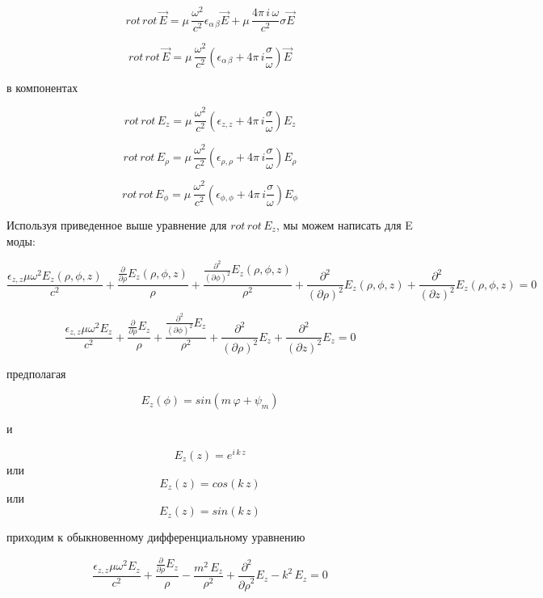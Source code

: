 \documentclass{article}
\begin{document}
$$rot\,rot\,\vec{E} = \mu\,\frac{\omega^2}{c^2} {\epsilon}_{\alpha\,\beta} \vec{E} + \mu\,\frac{4\pi\,i\,\omega}{c^2} \sigma \vec{E}$$

$$rot\,rot\,\vec{E} = \mu\,\frac{\omega^2}{c^2} \left({\epsilon}_{\alpha\,\beta} + 4\pi\,i\frac{\sigma}{\omega}\right) \vec{E}$$

в компонентах

$$rot\,rot\,{E}_{z} = \mu\,\frac{\omega^2}{c^2} \left({\epsilon}_{z,z} + 4\pi\,i\frac{\sigma}{\omega}\right) {E}_{z}$$

$$rot\,rot\,{E}_{\rho} = \mu\,\frac{\omega^2}{c^2} \left({\epsilon}_{\rho,\rho} + 4\pi\,i\frac{\sigma}{\omega}\right) {E}_{\rho}$$

$$rot\,rot\,{E}_{\phi} = \mu\,\frac{\omega^2}{c^2} \left({\epsilon}_{\phi,\phi} + 4\pi\,i\frac{\sigma}{\omega}\right) {E}_{\phi}$$

Используя приведенное выше уравнение для  $rot\,rot\,{E}_{z}$, мы можем написать для E моды:

$$\frac{{\epsilon}_{z,z} \mu \omega^{2} E_{z}\left({\rho}, {\phi}, \mathit{z}\right)}{c^{2}} + \frac{\frac{\partial}{\partial {\rho}}E_{z}\left({\rho}, {\phi}, \mathit{z}\right)}{{\rho}} + \frac{\frac{\partial^{2}}{(\partial {\phi})^{2}}E_{z}\left({\rho}, {\phi}, \mathit{z}\right)}{{\rho}^{2}} + \frac{\partial^{2}}{(\partial {\rho})^{2}}E_{z}\left({\rho}, {\phi}, \mathit{z}\right) + \frac{\partial^{2}}{(\partial \mathit{z})^{2}}E_{z}\left({\rho}, {\phi}, \mathit{z}\right) = 0$$


$$\frac{{\epsilon}_{z,z} \mu \omega^{2} E_{z}}{c^{2}} + \frac{\frac{\partial}{\partial {\rho}}E_{z}}{{\rho}} + \frac{\frac{\partial^{2}}{(\partial {\phi})^{2}}E_{z}}{{\rho}^{2}} + \frac{\partial^{2}}{(\partial {\rho})^{2}}E_{z} + \frac{\partial^{2}}{(\partial \mathit{z})^{2}}E_{z} = 0$$

предполагая

$$E_{z}(\phi) = sin(m\,\varphi + \psi_{m})$$

и

$$E_{z}(z) = e^{i\,k\,z}$$
или
$$E_{z}(z) = cos\left(k\,z\right)$$
или
$$E_{z}(z) = sin\left(k\,z\right)$$

приходим к обыкновенному дифференциальному уравнению

$$\frac{\epsilon_{z,z} \mu \omega^{2} E_{z}}{c^{2}} + \frac{\frac{\partial}{\partial {\rho}}E_{z}}{{\rho}} - \frac{m^{2}\,E_{z}}{{\rho}^{2}} + \frac{\partial^{2}}{{\partial {\rho}}^{2}}E_{z} - k^2\,E_{z} = 0$$
\end{document}
